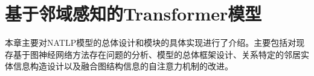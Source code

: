 \chapter{基于邻域感知的Transformer模型}


本章主要对NATLP模型的总体设计和模块的具体实现进行了介绍。主要包括对现存基于图神经网络方法存在问题的分析、模型的总体框架设计、关系特定的邻居实体信息构造设计以及融合图结构信息的自注意力机制的改进。








